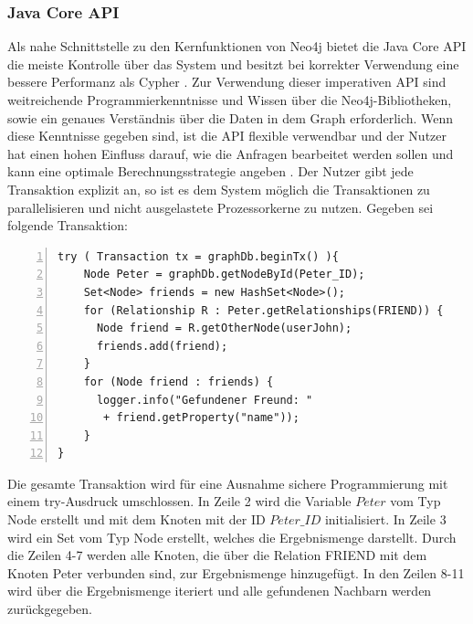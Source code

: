 \subsubsection{Java Core API}
Als nahe Schnittstelle zu den Kernfunktionen von Neo4j bietet die Java Core API die meiste Kontrolle über das System und besitzt bei korrekter Verwendung eine bessere Performanz als Cypher \parencite{vukotic2015neo4j}. Zur Verwendung dieser imperativen API sind weitreichende Programmierkenntnisse und Wissen über die Neo4j-Bibliotheken, sowie ein genaues Verständnis  über die Daten in dem Graph erforderlich. Wenn diese Kenntnisse gegeben sind, ist die API flexible verwendbar  und der Nutzer hat einen hohen Einfluss darauf, wie die Anfragen bearbeitet werden sollen und kann eine optimale Berechnungsstrategie angeben \parencite{vukotic2015neo4j}. Der Nutzer gibt jede Transaktion explizit an, so ist es dem System möglich die Transaktionen zu parallelisieren und nicht ausgelastete Prozessorkerne zu nutzen. Gegeben sei folgende Transaktion: \newline
\begin{Verbatim}[frame=single,numbers=left,xleftmargin=5mm]
try ( Transaction tx = graphDb.beginTx() ){ 
	Node Peter = graphDb.getNodeById(Peter_ID);
	Set<Node> friends = new HashSet<Node>();
	for (Relationship R : Peter.getRelationships(FRIEND)) {  
	  Node friend = R.getOtherNode(userJohn);
	  friends.add(friend);
	}
	for (Node friend : friends) {
	  logger.info("Gefundener Freund: "
	   + friend.getProperty("name")); 
	}
}
\end{Verbatim}
\noindent Die gesamte Transaktion wird für eine Ausnahme sichere Programmierung mit einem try-Ausdruck umschlossen. In Zeile 2 wird die Variable $Peter$ vom Typ Node erstellt und mit dem Knoten mit der ID $Peter\_ID$ initialisiert. In Zeile 3 wird ein Set vom Typ Node erstellt, welches die Ergebnismenge darstellt. Durch die Zeilen 4-7 werden alle Knoten, die über die Relation FRIEND mit dem Knoten Peter verbunden sind, zur Ergebnismenge hinzugefügt. In den Zeilen 8-11 wird über die Ergebnismenge  iteriert und  alle gefundenen Nachbarn werden zurückgegeben. 

